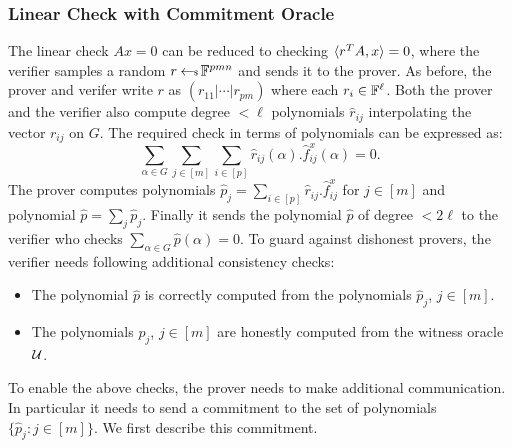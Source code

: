 \subsubsection{Linear Check with Commitment Oracle}
The linear check $Ax=0$ can be reduced to checking
$\langle r^TA,x\rangle=0$, where the verifier samples a random $r\hskip2.3pt{\gets\!\!\mbox{\tiny${\$}$\normalsize}}\, \mathbb{F}^{pmn}$
and sends it to the prover. As before, the prover and verifer write $r$ as
$(r_{11}|\cdots|r_{pm})$ where each $r_i\in \mathbb{F}^\ell$. Both the prover and the
verifier also compute degree $<\ell$ polynomials $\hat{r}_{ij}$ interpolating
the vector $r_{ij}$ on $G$. The required check in terms of polynomials can be
expressed as:
\begin{equation}\label{eq:lincheck}
\sum_{\alpha\in G}\sum_{j\in [m]}\sum_{i\in [p]}
\hat{r}_{ij}(\alpha).\hat{f}^x_{ij}(\alpha) = 0.
\end{equation}
The prover computes polynomials $\hat{p}_j = \sum_{i\in
[p]}\hat{r}_{ij}.\hat{f}^x_{ij}$ for $j\in [m]$ and polynomial $\hat{p}=\sum_j
\hat{p}_j$. Finally it sends the polynomial $\hat{p}$ of degree $< 2\ell$ to
the verifier who checks $\sum_{\alpha\in G}\hat{p}(\alpha)=0$. To guard against
dishonest provers, the verifier needs following additional consistency checks:
\begin{itemize}
\item The polynomial $\hat{p}$ is correctly computed from the polynomials
$\hat{p}_j$, $j\in [m]$.
\item The polynomials $p_j$, $j\in [m]$ are honestly computed from the witness
oracle $\mathcal{U}$.
\end{itemize}
To enable the above checks, the prover needs to make additional communication.
In particular it needs to send a commitment to the set of polynomials
$\{\hat{p}_j: j\in [m]\}$. We first describe this commitment.\smallskip

